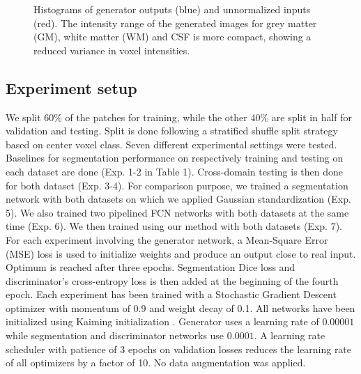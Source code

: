 \documentclass{article}
\begin{document}
\begin{figure*}[ht!]
    \begin{footnotesize}
    \end{footnotesize}
    \caption{Histograms of generator outputs (blue) and unnormalized inputs (red). The intensity range of the generated images for grey matter (GM), white matter (WM) and CSF is more compact, showing a reduced variance in voxel intensities.}\label{histograms}
\end{figure*}

\subsection{Experiment setup}

We split 60\% of the patches for training, while the other 40\% are split in half for validation and testing. Split is done following a stratified shuffle split strategy based on center voxel class. Seven different experimental settings were tested. Baselines for segmentation performance on respectively training and testing on each dataset are done (Exp. 1-2 in Table 1). Cross-domain testing is then done for both dataset (Exp. 3-4). For comparison purpose, we trained a segmentation network with both datasets on which we applied Gaussian standardization (Exp. 5). We also trained two pipelined FCN networks with both datasets at the same time (Exp. 6). We then trained using our method with both datasets (Exp. 7). For each experiment involving the generator network, a Mean-Square Error (MSE) loss is used to initialize weights and produce an output close to real input. Optimum is reached after three epochs. Segmentation Dice loss and discriminator's cross-entropy loss is then added at the beginning of the fourth epoch. Each experiment has been trained with a Stochastic Gradient Descent optimizer with momentum of 0.9 and weight decay of 0.1. All networks have been initialized using Kaiming initialization \cite{He2015}. Generator uses a learning rate of $0.00001$ while segmentation and discriminator networks use $0.0001$. A learning rate scheduler with patience of 3 epochs on validation losses reduces the learning rate of all optimizers by a factor of 10. No data augmentation was applied.
\end{document}
